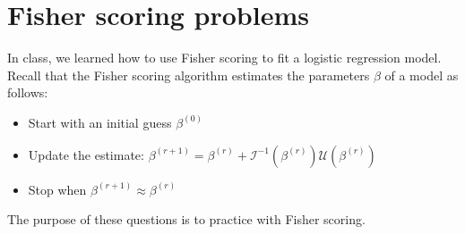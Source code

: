 \documentclass[11pt]{article}
\begin{document}
\section*{Fisher scoring problems}

In class, we learned how to use Fisher scoring to fit a logistic regression model. Recall that the Fisher scoring algorithm estimates the parameters $\beta$ of a model as follows:

\begin{itemize}
\item Start with an initial guess $\beta^{(0)}$
\item Update the estimate: $\beta^{(r+1)} = \beta^{(r)} + \mathcal{I}^{-1}(\beta^{(r)}) \mathcal{U}(\beta^{(r)})$
\item Stop when $\beta^{(r+1)} \approx \beta^{(r)}$
\end{itemize}

\noindent The purpose of these questions is to practice with Fisher scoring.\\
\end{document}
